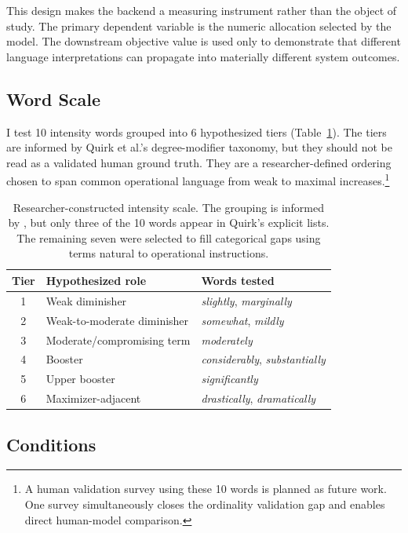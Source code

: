 \documentclass[11pt]{article}
\begin{document}
This design makes the backend a measuring instrument rather than the object of study. The primary dependent variable is the numeric allocation selected by the model. The downstream objective value is used only to demonstrate that different language interpretations can propagate into materially different system outcomes.

\subsection{Word Scale}

I test 10 intensity words grouped into 6 hypothesized tiers (Table~\ref{tab:wordscale}). The tiers are informed by Quirk et al.'s degree-modifier taxonomy, but they should not be read as a validated human ground truth. They are a researcher-defined ordering chosen to span common operational language from weak to maximal increases.\footnote{A human validation survey using these 10 words is planned as future work. One survey simultaneously closes the ordinality validation gap and enables direct human-model comparison.}

\begin{table}[h]
\centering
\small
\begin{tabular}{cll}
\toprule
\textbf{Tier} & \textbf{Hypothesized role} & \textbf{Words tested} \\
\midrule
1 & Weak diminisher & \textit{slightly}, \textit{marginally} \\
2 & Weak-to-moderate diminisher & \textit{somewhat}, \textit{mildly} \\
3 & Moderate/compromising term & \textit{moderately} \\
4 & Booster & \textit{considerably}, \textit{substantially} \\
5 & Upper booster & \textit{significantly} \\
6 & Maximizer-adjacent & \textit{drastically}, \textit{dramatically} \\
\bottomrule
\end{tabular}
\caption{Researcher-constructed intensity scale. The grouping is informed by \citet{quirk1985}, but only three of the 10 words appear in Quirk's explicit lists. The remaining seven were selected to fill categorical gaps using terms natural to operational instructions.}
\label{tab:wordscale}
\end{table}

\subsection{Conditions}
\end{document}
